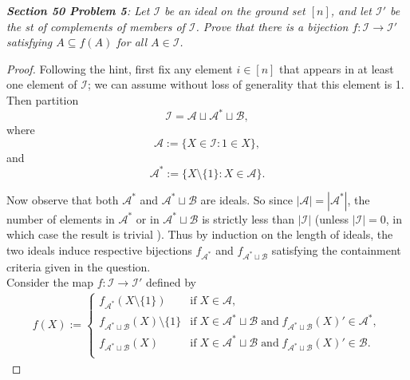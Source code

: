 \documentclass{article}
\begin{document}
\it \textbf{Section 50 Problem 5}: Let $\mathcal{I}$ be an ideal on the
  ground set $[n]$, and let $\mathcal{I}'$ be the st of complements of
  members of $\mathcal{I}$. Prove that there is a bijection
  $f:\mathcal{I}\rightarrow\mathcal{I}'$ satisfying $A\subseteq f(A)$ for
  all $A\in\mathcal{I}$.

  \begin{proof}
    Following the hint, first fix any element $i\in[n]$ that appears in at
    least one element of $\mathcal{I}$; we can assume without loss of
    generality that this element is 1. Then partition
    \[\mathcal{I}=\mathcal{A}\sqcup\mathcal{A}^*\sqcup\mathcal{B},\]
    where
    \[\mathcal{A} :=\{X\in\mathcal{I}: 1\in X\},\]
    and
    \[\mathcal{A}^* :=\{X\setminus\{1\}: X\in\mathcal{A}\}.\]

    Now observe that both $\mathcal{A}^*$ and
    $\mathcal{A}^*\sqcup\mathcal{B}$ are ideals. So since
    $|\mathcal{A}|=|\mathcal{A}^*|$, the number of elements in
    $\mathcal{A}^*$ or in $\mathcal{A}^*\sqcup\mathcal{B}$ is strictly less
    than $|\mathcal{I}|$ (unless $|\mathcal{I}|=0$, in which case the
    result is trivial ). Thus by induction on the length of ideals, the two
    ideals induce respective bijections $f_{\mathcal{A}^*}$ and
    $f_{\mathcal{A}^*\sqcup\mathcal{B}}$ satisfying the containment
    criteria given in the question. \\


    Consider the map $f:\mathcal{I}\rightarrow\mathcal{I}'$ defined by
    \begin{align*}
      f(X) :=
      \begin{cases}
        f_{\mathcal{A}^*}(X\setminus\{1\}) &\text{if}\; X\in \mathcal{A},\\
        f_{\mathcal{A}^*\sqcup\mathcal{B}}(X)\setminus\{1\} &\text{if}\; X\in
          \mathcal{A}^*\sqcup\mathcal{B}\; \text{and}\;
          f_{\mathcal{A}^*\sqcup\mathcal{B}}(X)' \in\mathcal{A}^*,\\
        f_{\mathcal{A}^*\sqcup\mathcal{B}}(X) &\text{if}\; X\in
          \mathcal{A}^*\sqcup\mathcal{B}\; \text{and}\;
          f_{\mathcal{A}^*\sqcup\mathcal{B}}(X)' \in\mathcal{B}.\\
      \end{cases}
    \end{align*}


\end{proof}
\end{document}
